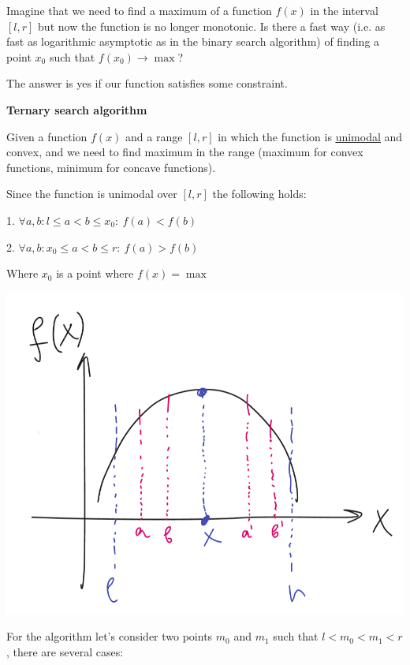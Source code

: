 
Imagine that we need to find a maximum of a function $f(x)$ in the interval $[l, r]$ but now the function is no longer monotonic. Is there a fast way (i.e. as fast as logarithmic asymptotic as in the binary search algorithm) of finding a point $x_0$ such that $f(x_0) \to \max$?

The answer is yes if our function satisfies some constraint.

\begin{definition}
    \textbf{Ternary search algorithm}

    Given a function $f(x)$ and a range $[l, r]$ in which the function is \href{https://en.wikipedia.org/wiki/Unimodality}{\underline{unimodal}} and convex, and we need to find maximum in the range (maximum for convex functions, minimum for concave functions).

    Since the function is unimodal over $[l, r]$ the following holds:

    1. $\forall a, b: l \leq a < b \leq x_0: \ f(a) < f(b)$

    2. $\forall a, b: x_0 \leq a < b \leq r: \ f(a) > f(b)$

    Where $x_0$ is a point where $f(x) = \max$

    \begin{center}
        \includegraphics[scale=0.7]{./assets/09-ternary-search/1.PNG}
    \end{center}

    For the algorithm let's consider two points $m_0$ and $m_1$ such that $l < m_0 < m_1 < r$, there are several cases:


\end{definition}
